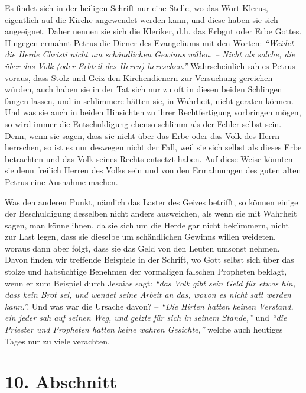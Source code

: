 Es findet sich in der heiligen Schrift nur eine Stelle, wo das Wort
Klerus,
eigentlich auf die Kirche angewendet werden kann, und diese haben sie sich
angeeignet. Daher nennen sie sich die Kleriker, d.h. das Erbgut oder Erbe
Gottes. Hingegen ermahnt Petrus die Diener des
Evangeliums mit den Worten:
\textit{"`Weidet die Herde Christi nicht um schändlichen Gewinns willen. --
Nicht
als solche, die über das Volk (oder Erbteil des Herrn) herrschen."'}
Wahrscheinlich sah es Petrus voraus, dass Stolz und Geiz den Kirchendienern zur
Versuchung gereichen würden, auch haben sie in der Tat sich nur zu oft in
diesen beiden Schlingen fangen lassen, und in schlimmere hätten sie, in
Wahrheit, nicht geraten können. Und was sie auch in beiden Hinsichten zu ihrer
Rechtfertigung vorbringen mögen, so wird immer die Entschuldigung ebenso
schlimm als der Fehler selbst sein. Denn, wenn sie sagen, dass sie nicht über
das
Erbe oder das Volk des Herrn herrschen, so ist es nur deswegen nicht der Fall,
weil sie sich selbst als dieses Erbe betrachten und das Volk seines Rechts
entsetzt haben. Auf diese Weise könnten sie denn freilich Herren des Volks sein
und von den Ermahnungen des guten alten Petrus eine Ausnahme machen.

\medskip

Was den anderen Punkt, nämlich das Laster des Geizes
betrifft, so können einige
der Beschuldigung desselben nicht anders ausweichen, als wenn sie mit Wahrheit
sagen, man könne ihnen, da sie sich um die Herde gar nicht bekümmern, nicht zur
Last legen, dass sie dieselbe um schändlichen Gewinns willen weideten, woraus
dann aber folgt, dass sie das Geld von den Leuten umsonst nehmen. Davon finden
wir treffende Beispiele in der Schrift, wo Gott selbst sich über das stolze und
habsüchtige Benehmen der vormaligen falschen Propheten beklagt, wenn er zum Beispiel
durch Jesaias sagt:
\textit{"`das Volk gibt sein Geld für etwas hin,
dass kein Brot sei,
und wendet seine Arbeit an das, wovon es nicht satt werden
kann."'.}
Und was war die Ursache davon? --
\textit{"`Die Hirten hatten keinen Verstand, ein
jeder sah auf seinen Weg, und geizte für sich in seinem
Stande,"'} und
\textit{"`die Priester und Propheten hatten keine wahren
Gesichte,"'}
welche auch heutiges Tages nur zu viele
verachten.

\section{10. Abschnitt} \label{kap12_ab10}

